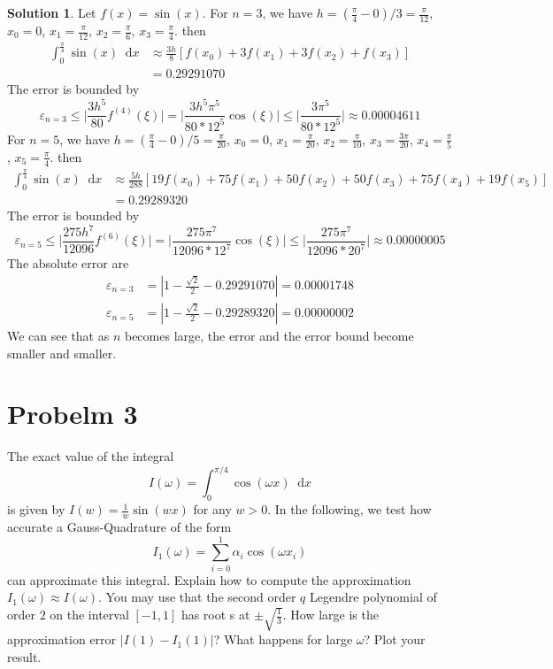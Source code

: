 \documentclass{article}
\newcommand*\diff{\mathop{}\!\mathrm{d}}
\theoremstyle{definition}
\newtheorem{solution}{Solution}
\begin{document}
\begin{solution}
	Let $f(x)=\sin(x)$.
	For $n=3$, we have $h=(\frac{\pi}{4}-0)/3=\frac{\pi}{12}$, $x_0=0$, $x_1=\frac{\pi}{12}$, $x_2=\frac{\pi}{6}$, $x_3=\frac{\pi}{4}$. then
	\begin{align*}
	\int_{0}^{\frac{\pi}{4}}\sin(x)\diff x&\approx \frac{3h}{8}\left[f(x_0)+3f(x_1)+3f(x_2)+f(x_3)\right]\\
	&=0.29291070
	\end{align*}
	The error is bounded by 
	\begin{equation}
		\varepsilon_{n=3}\leq \Big|\frac{3h^5}{80}f^{(4)}(\xi)\Big|=\Big|\frac{3h^5\pi^5}{80*12^5}\cos(\xi)\Big|\leq \Big|\frac{3\pi^5}{80*12^5}\Big|\approx 0.00004611
	\end{equation}
	For $n=5$, we have $h=(\frac{\pi}{4}-0)/5=\frac{\pi}{20}$, $x_0=0$, $x_1=\frac{\pi}{20}$, $x_2=\frac{\pi}{10}$, $x_3=\frac{3\pi}{20}$, $x_4=\frac{\pi}{5}$, $x_5=\frac{\pi}{4}$. then
	\begin{align*}
	\int_{0}^{\frac{\pi}{4}}\sin(x)\diff x&\approx \frac{5h}{288}\left[19f(x_0)+75f(x_1)+50f(x_2)+50f(x_3)+75f(x_4)+19f(x_5)\right]\\
	&=0.29289320
	\end{align*}
	The error is bounded by
	\begin{equation}
		\varepsilon_{n=5}\leq \Big|\frac{275h^7}{12096}f^{(6)}(\xi)\Big|=\Big|\frac{275\pi^7}{12096*12^7}\cos(\xi)\Big|\leq \Big|\frac{275\pi^7}{12096*20^7}\Big|\approx 0.00000005
	\end{equation}
	The absolute error are
	\begin{align*}
		\varepsilon_{n=3}&=|1-\frac{\sqrt{2}}{2}-0.29291070|=0.00001748\\
		\varepsilon_{n=5}&=|1-\frac{\sqrt{2}}{2}-0.29289320|=0.00000002
	\end{align*}
	We can see that as $n$ becomes large, the error and the error bound become smaller and smaller.
\end{solution}

\section{Probelm 3}
The exact value of the integral
\begin{equation}
	I(\omega)=\int_{0}^{\pi/4}\cos(\omega x)\diff x
\end{equation}
is given by $I(w)=\frac{1}{w}\sin(wx)$ for any $w>0$. In the following, we test
how accurate a Gauss-Quadrature of the form
\begin{equation}
	\label{eq:Gauss-Quadrature}
	I_1(\omega)=\sum_{i=0}^{1}\alpha_i\cos(\omega x_i)
\end{equation}
can approximate this integral. Explain how to compute the approximation $I_1(\omega) \approx I(\omega)$. You may use that the second order $q$ Legendre
polynomial of order $2$ on the interval $[-1,1]$ has root s at $\pm\sqrt{\frac{1}{3}}$. How
large is the approximation error $|I(1)-I_1(1)|$? What happens for large $\omega$? Plot your result.
\end{document}
